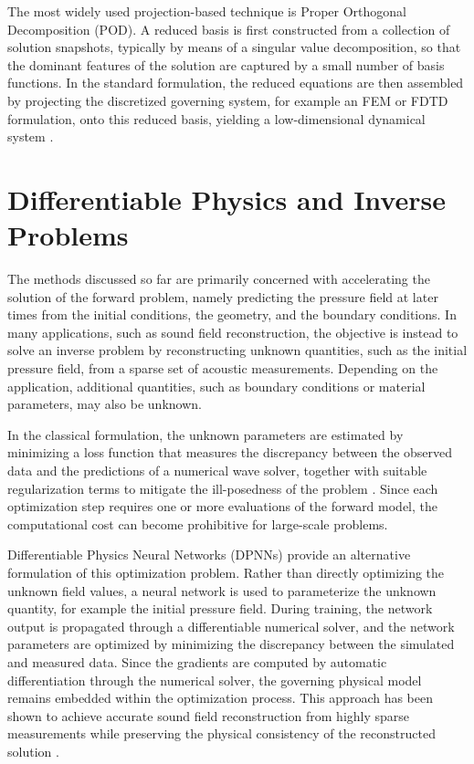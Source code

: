 \documentclass{Configuration_Files/PoliMi3i_thesis}
\newif\ifshowthesischanges
\DeclareRobustCommand{\thesischange}[2]{%
    \ifshowthesischanges
        \textcolor{#1}{#2}%
    \else
        #2%
    \fi
}
\def\thesischange#1#2{#2}%
\begin{document}
The most widely used projection-based technique is Proper Orthogonal Decomposition (POD). A reduced basis is first constructed from a collection of solution snapshots, typically by means of a singular value decomposition, so that the dominant features of the solution are captured by a small number of basis functions. In the standard formulation, the reduced equations are then assembled by projecting the discretized governing system, for example an FEM or FDTD formulation, onto this reduced basis, yielding a low-dimensional dynamical system \citep{schilders_model_2008}.
%
\section{\thesischange{red}{Differentiable Physics and Inverse Problems}}
The methods discussed so far are primarily concerned with accelerating the solution of the forward problem, namely predicting the pressure field at later times from the initial conditions, the geometry, and the boundary conditions. In many applications, such as sound field reconstruction, the objective is instead to solve an inverse problem by reconstructing unknown quantities, such as the initial pressure field, from a sparse set of acoustic measurements. Depending on the application, additional quantities, such as boundary conditions or material parameters, may also be unknown.

In the classical formulation, the unknown parameters are estimated by minimizing a loss function that measures the discrepancy between the observed data and the predictions of a numerical wave solver, together with suitable regularization terms to mitigate the ill-posedness of the problem \citep{bi_sound_2019}. Since each optimization step requires one or more evaluations of the forward model, the computational cost can become prohibitive for large-scale problems.

Differentiable Physics Neural Networks (DPNNs) provide an alternative formulation of this optimization problem. Rather than directly optimizing the unknown field values, a neural network is used to parameterize the unknown quantity, for example the initial pressure field. During training, the network output is propagated through a differentiable numerical solver, and the network parameters are optimized by minimizing the discrepancy between the simulated and measured data. Since the gradients are computed by automatic differentiation through the numerical solver, the governing physical model remains embedded within the optimization process. This approach has been shown to achieve accurate sound field reconstruction from highly sparse measurements while preserving the physical consistency of the reconstructed solution \citep{verburg_differentiable_2025}.
%
\end{document}
